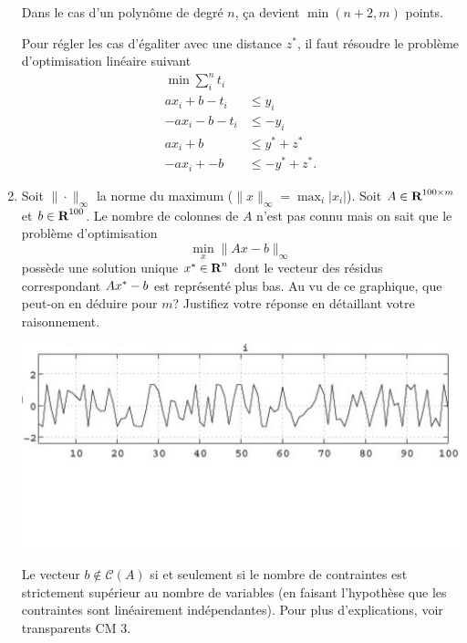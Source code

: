 \begin{enumerate}
\begin{solution}
      Dans le cas d'un polynôme de degré $n$,
      ça devient $\min(n+2,m)$ points.

      Pour régler les cas d'égaliter avec une distance $z^*$,
      il faut résoudre le problème d'optimisation linéaire suivant
      \begin{align*}
        \min \sum_i^n t_i\\
        ax_i + b - t_i & \leq y_i\\
        -ax_i - b - t_i & \leq -y_i\\
        ax_i + b & \leq y^* + z^*\\
        -ax_i + -b & \leq -y^* + z^*.
      \end{align*}
    \end{solution}

  \item  Soit $\| \cdot \|_{\infty}$ la norme du maximum ($\| x \|_{\infty}=\max_i |x_i|$).
    Soit $A \in {\mbox{\bf R}}^{100 \times m}$  et
    $b
    \in
    {\mbox{\bf R}}^{100}$. Le nombre de colonnes de $A$ n'est pas connu mais on sait que le problème
    d'optimisation
    $$\min_{x} \|Ax-b\|_{\infty}$$
    possède une solution unique  $x^* \in {\mbox{\bf R}}^n$ dont  le
    vecteur des résidus correspondant $Ax^*-b$ est représenté plus bas. Au vu de ce graphique, que peut-on en
    déduire pour
    $m$? Justifiez votre réponse en détaillant votre raisonnement.

    \begin{center}
      \includegraphics[scale=0.3]{residus.jpg}
    \end{center}

    \begin{solution}
      Le vecteur $b \notin \mathcal{C}(A) $ si et seulement si le nombre de
      contraintes est strictement supérieur au nombre de variables
      (en faisant l'hypothèse que les contraintes
      sont linéairement indépendantes).
      Pour plus d'explications, voir transparents CM 3.
    \end{solution}


\end{enumerate}
